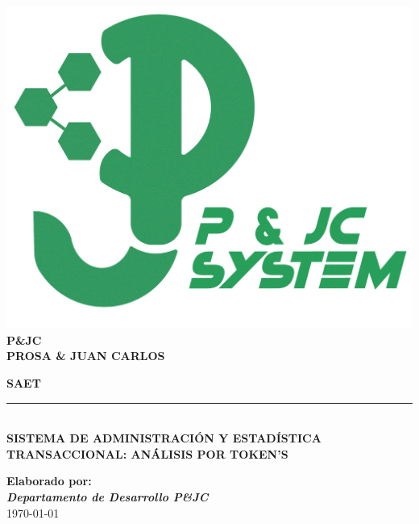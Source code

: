 \begin{titlepage}
	
	\centering %
	\includegraphics[scale=0.15]{imagenes/pyjc} %
	\LARGE \textbf{\\ P\&JC}
	\LARGE \textbf{\\ PROSA \& JUAN CARLOS}
	\vspace{1cm} %
	
	\large \textbf{SAET}
	\rule{13cm}{3pt} %
	\large \textbf{\\ SISTEMA DE ADMINISTRACIÓN Y ESTADÍSTICA TRANSACCIONAL: ANÁLISIS POR TOKEN'S} %
	
	\vspace{1cm} %
	
	\textbf{Elaborado por:}\\
	\vspace{0.5cm} %
	\textit \textbf{Departamento de Desarrollo P\&JC}\\
	
	\vspace{1cm} %
	\today
	
\end{titlepage}